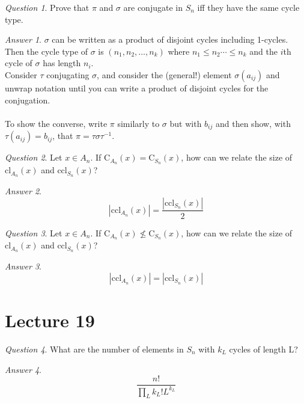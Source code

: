 \documentclass[]{article}
\theoremstyle{remark}
\theoremstyle{qnstyle}
\newtheorem{question}{Question}
\theoremstyle{answerstyle}
\newtheorem*{answer}{Answer}
\begin{document}
\begin{question}
    Prove that $\pi$ and $\sigma$ are conjugate in $S_n$ iff they have the same cycle type.
\end{question}
\begin{answer}
    $\sigma$ can be written as a product of disjoint cycles including 1-cycles. Then the cycle type of $\sigma$ is 
    $(n_1, n_2, \ldots, n_k)$ where $n_1 \leq n_2 \cdots \leq n_k$ and the $i$th cycle of $\sigma$ has length $n_i$. \\
    Consider $\tau$ conjugating $\sigma$, and consider the (general!) element $\sigma(a_{ij})$ and unwrap notation until
    you can write a product of disjoint cycles for the conjugation. \\ \\
    To show the converse, write $\pi$ similarly to $\sigma$ but with $b_{ij}$ and then show, with $\tau(a_{ij}) = b_{ij}$, that $\pi = \tau \sigma \tau^{-1}$.
\end{answer}

\begin{question}
    Let $x \in A_n$.  If $\text{C}_{A_n}(x) = \text{C}_{S_n}(x)$, how can we relate
    the size of $\text{cl}_{A_n}(x)$ and $\text{ccl}_{S_n}(x)$?
\end{question}
\begin{answer}
    $$|\text{ccl}_{A_n}(x)| = \frac{|\text{ccl}_{S_n}(x)|}{2}$$
\end{answer}

\begin{question}
    Let $x \in A_n$.  If $\text{C}_{A_n}(x) \nleq  \text{C}_{S_n}(x)$, how can we relate
    the size of $\text{cl}_{A_n}(x)$ and $\text{ccl}_{S_n}(x)$?
\end{question}
\begin{answer}
    $$|\text{ccl}_{A_n}(x)| = {|\text{ccl}_{S_n}(x)|}$$
\end{answer}






\section* {Lecture 19}

\begin{question}
    What are the number of elements in $S_n$ with $k_L$ cycles of length L?
\end{question}
\begin{answer}
    $$\frac{n!}{\prod_L{k_L! L^{k_L}}}$$
\end{answer}
\end{document}
